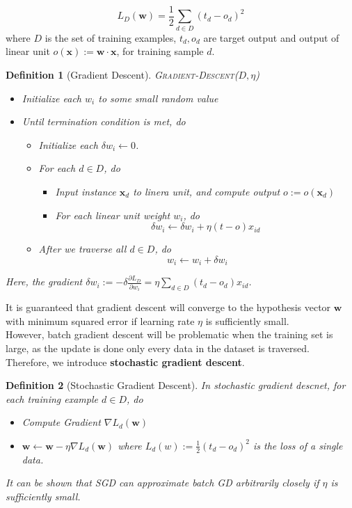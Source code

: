 \documentclass[12pt]{article}
\newtheorem{definition}{Definition}[section]
\theoremstyle{definition}
\begin{document}
\[
L_D(\mathbf{w})=\frac{1}{2}\sum_{d\in D}(t_d-o_d)^2
\]
where $D$ is the set of training examples, $t_d, o_d$ are target output and output of linear unit $o(\mathbf{x}):=\mathbf{w}\cdot \mathbf{x}$, for training sample $d$.
\begin{definition}[Gradient Descent]
\normalfont \textsc{Gradient-Descent}($D,\eta$)\\
\begin{itemize}
\item Initialize each $w_i$ to some small random value
\item Until termination condition is met, do
\begin{itemize}
\item Initialize each $\delta w_i\leftarrow 0$.
\item For each $d\in D$, do
\begin{itemize}
\item Input instance $\mathbf{x}_d$ to linera unit, and compute output $o:=o(\mathbf{x}_d)$
\item For each linear unit weight $w_i$, do
\[
\delta w_i\leftarrow \delta w_i + \eta(t-o)x_{id}
\]
\end{itemize}
\item After we traverse all $d\in D$, do
\[
w_i\leftarrow w_i+\delta w_i
\]
\end{itemize}
\end{itemize}
Here, the gradient $\delta w_i:=-\delta \frac{\partial L_D}{\partial w_i}=\eta\sum_{d\in D}(t_d-o_d)x_{id}$.
\end{definition}
It is guaranteed that gradient descent will converge to the hypothesis vector $\mathbf{w}$ with minimum squared error if learning rate $\eta$ is sufficiently small.\\
However, batch gradient descent will be problematic when the training set is large, as the update is done only every data in the dataset is traversed. Therefore, we introduce \textbf{stochastic gradient descent}.
\begin{definition}[Stochastic Gradient Descent]
\normalfont In stochastic gradient descnet, for each training example $d\in D$, do
\begin{itemize}
	\item Compute Gradient $\nabla L_d(\mathbf{w})$
	\item $\mathbf{w}\leftarrow \mathbf{w}-\eta\nabla L_d(\mathbf{w})$ where $L_d(w):=\frac{1}{2}(t_d-o_d)^2$ is the loss of a single data.
\end{itemize}
It can be shown that SGD can approximate batch GD arbitrarily closely if $\eta$ is sufficiently small.
\end{definition}
\end{document}
